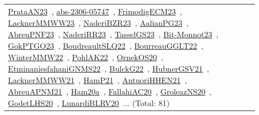 {\begin{longtable}{lp{3cm}>{\raggedright\arraybackslash}p{6cm}>{\raggedright\arraybackslash}p{6cm}>{\raggedright\arraybackslash}p{8cm}}
\href{../works/PrataAN23.pdf}{PrataAN23}~\cite{PrataAN23}, \href{../works/abs-2306-05747.pdf}{abs-2306-05747}~\cite{abs-2306-05747}, \href{../works/FrimodigECM23.pdf}{FrimodigECM23}~\cite{FrimodigECM23}, \href{../works/LacknerMMWW23.pdf}{LacknerMMWW23}~\cite{LacknerMMWW23}, \href{../works/NaderiBZR23.pdf}{NaderiBZR23}~\cite{NaderiBZR23}, \href{../works/AalianPG23.pdf}{AalianPG23}~\cite{AalianPG23}, \href{../works/AbreuPNF23.pdf}{AbreuPNF23}~\cite{AbreuPNF23}, \href{../works/NaderiRR23.pdf}{NaderiRR23}~\cite{NaderiRR23}, \href{../works/TasselGS23.pdf}{TasselGS23}~\cite{TasselGS23}, \href{../works/Bit-Monnot23.pdf}{Bit-Monnot23}~\cite{Bit-Monnot23}, \href{../works/GokPTGO23.pdf}{GokPTGO23}~\cite{GokPTGO23}, \href{../works/BoudreaultSLQ22.pdf}{BoudreaultSLQ22}~\cite{BoudreaultSLQ22}, \href{../works/BourreauGGLT22.pdf}{BourreauGGLT22}~\cite{BourreauGGLT22}, \href{../works/WinterMMW22.pdf}{WinterMMW22}~\cite{WinterMMW22}, \href{../works/PohlAK22.pdf}{PohlAK22}~\cite{PohlAK22}, \href{../works/OrnekOS20.pdf}{OrnekOS20}~\cite{OrnekOS20}, \href{../works/EtminaniesfahaniGNMS22.pdf}{EtminaniesfahaniGNMS22}~\cite{EtminaniesfahaniGNMS22}, \href{../works/BulckG22.pdf}{BulckG22}~\cite{BulckG22}, \href{../works/HubnerGSV21.pdf}{HubnerGSV21}~\cite{HubnerGSV21}, \href{../works/LacknerMMWW21.pdf}{LacknerMMWW21}~\cite{LacknerMMWW21}, \href{../works/HamP21.pdf}{HamP21}~\cite{HamP21}, \href{../works/AntuoriHHEN21.pdf}{AntuoriHHEN21}~\cite{AntuoriHHEN21}, \href{../works/AbreuAPNM21.pdf}{AbreuAPNM21}~\cite{AbreuAPNM21}, \href{../works/Ham20a.pdf}{Ham20a}~\cite{Ham20a}, \href{../works/FallahiAC20.pdf}{FallahiAC20}~\cite{FallahiAC20}, \href{../works/GroleazNS20.pdf}{GroleazNS20}~\cite{GroleazNS20}, \href{../works/GodetLHS20.pdf}{GodetLHS20}~\cite{GodetLHS20}, \href{../works/LunardiBLRV20.pdf}{LunardiBLRV20}~\cite{LunardiBLRV20}... (Total: 81)\\

\end{longtable}}
